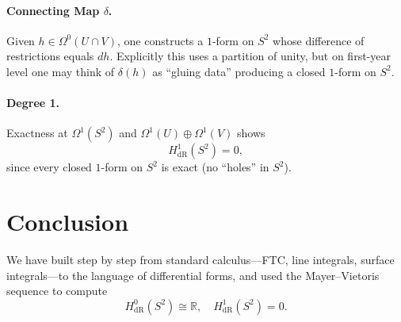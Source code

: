 \documentclass[12pt]{article}
\newcommand{\R}{\mathbb{R}}
\begin{document}
	\paragraph{Connecting Map \(\delta\).}
	Given \(h\in\Omega^0(U\cap V)\), one constructs a \(1\)-form on \(S^2\) whose difference of restrictions equals \(dh\).  Explicitly this uses a partition of unity, but on first-year level one may think of \(\delta(h)\) as “gluing data” producing a closed \(1\)-form on \(S^2\).
	
	\paragraph{Degree 1.}
	Exactness at \(\Omega^1(S^2)\) and \(\Omega^1(U)\oplus\Omega^1(V)\) shows
	\[
	H^1_{\mathrm{dR}}(S^2)=0,
	\]
	since every closed \(1\)-form on \(S^2\) is exact (no “holes” in \(S^2\)).
	
	\section*{Conclusion}
	We have built step by step from standard calculus—FTC, line integrals, surface integrals—to the language of differential forms, and used the Mayer–Vietoris sequence to compute
	\[
	H^0_{\mathrm{dR}}(S^2)\cong\R,
	\quad
	H^1_{\mathrm{dR}}(S^2)=0.
	\]
\end{document}
